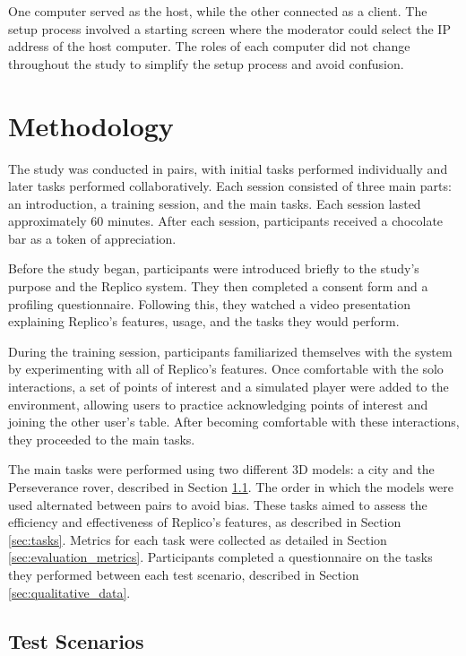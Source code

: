     One computer served as the host, while the other connected as a client. The setup process involved a starting screen where the moderator could select the IP address of the host computer. The roles of each computer did not change throughout the study to simplify the setup process and avoid confusion.

\section{Methodology}

    The study was conducted in pairs, with initial tasks performed individually and later tasks performed collaboratively. Each session consisted of three main parts: an introduction, a training session, and the main tasks. Each session lasted approximately 60 minutes. After each session, participants received a chocolate bar as a token of appreciation.

    Before the study began, participants were introduced briefly to the study's purpose and the Replico system. They then completed a consent form and a profiling questionnaire. Following this, they watched a video presentation explaining Replico's features, usage, and the tasks they would perform.

    During the training session, participants familiarized themselves with the system by experimenting with all of Replico's features. Once comfortable with the solo interactions, a set of points of interest and a simulated player were added to the environment, allowing users to practice acknowledging points of interest and joining the other user's table. After becoming comfortable with these interactions, they proceeded to the main tasks.

    The main tasks were performed using two different 3D models: a city and the Perseverance rover, described in Section \ref{sec:test_scenarios}. The order in which the models were used alternated between pairs to avoid bias. These tasks aimed to assess the efficiency and effectiveness of Replico's features, as described in Section \ref{sec:tasks}. Metrics for each task were collected as detailed in Section \ref{sec:evaluation_metrics}. Participants completed a questionnaire on the tasks they performed between each test scenario, described in Section \ref{sec:qualitative_data}.

    \subsection{Test Scenarios} \label{sec:test_scenarios}

